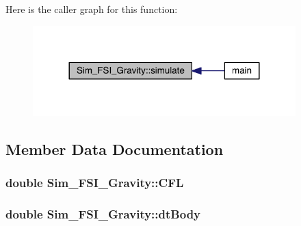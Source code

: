 Here is the caller graph for this function\+:\nopagebreak
\begin{figure}[H]
\begin{center}
\leavevmode
\includegraphics[width=288pt]{d6/de6/class_sim___f_s_i___gravity_add86d6f52de51511f0bb93714fc504c4_icgraph}
\end{center}
\end{figure}




\subsection{Member Data Documentation}
\hypertarget{class_sim___f_s_i___gravity_ac73b8e37488e3f55a67d3b62eb4a98bf}{}
\subsubsection[{C\+F\+L}]{\setlength{\rightskip}{0pt plus 5cm}double Sim\+\_\+\+F\+S\+I\+\_\+\+Gravity\+::\+C\+F\+L\hspace{0.3cm}{\ttfamily [protected]}}\label{class_sim___f_s_i___gravity_ac73b8e37488e3f55a67d3b62eb4a98bf}
\hypertarget{class_sim___f_s_i___gravity_aa5eb5526dc487939dc0ef241e904481c}{}
\subsubsection[{dt\+Body}]{\setlength{\rightskip}{0pt plus 5cm}double Sim\+\_\+\+F\+S\+I\+\_\+\+Gravity\+::dt\+Body\hspace{0.3cm}{\ttfamily [protected]}}\label{class_sim___f_s_i___gravity_aa5eb5526dc487939dc0ef241e904481c}
\hypertarget{class_sim___f_s_i___gravity_a4056a32c94c0375219f3248e29df7535}{}
